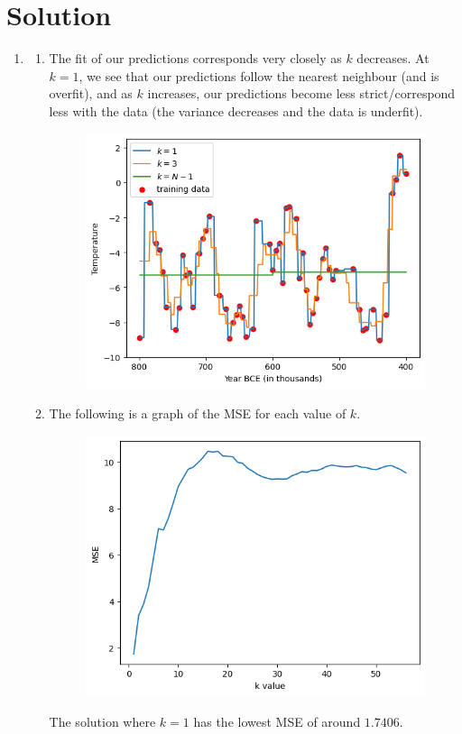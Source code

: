 \documentclass[submit]{../harvardml}
\newenvironment{solution}
  {\color{blue}\section*{Solution}}
{}
\begin{document}
\newpage
\begin{solution}
	\begin{enumerate}
	    \item \begin{enumerate}
	        \item The fit of our predictions corresponds very closely as $k$ decreases. At $k=1$, we see that our predictions follow the nearest neighbour (and is overfit), and as $k$ increases, our predictions become less strict/correspond less with the data (the variance decreases and the data is underfit).
            \begin{figure}[H]
	        \centering
	        \includegraphics[width=0.5\linewidth]{p1.1a.png}
	    \end{figure}
    
                \item The following is a graph of the MSE for each value of $k$.
                \begin{figure}[H]
                    \centering
                    \includegraphics[width=0.5\linewidth]{p1.2.png}
                \end{figure}

                The solution where $k=1$ has the lowest MSE of around $1.7406$.
                

\end{enumerate}
\end{enumerate}
\end{solution}
\end{document}
